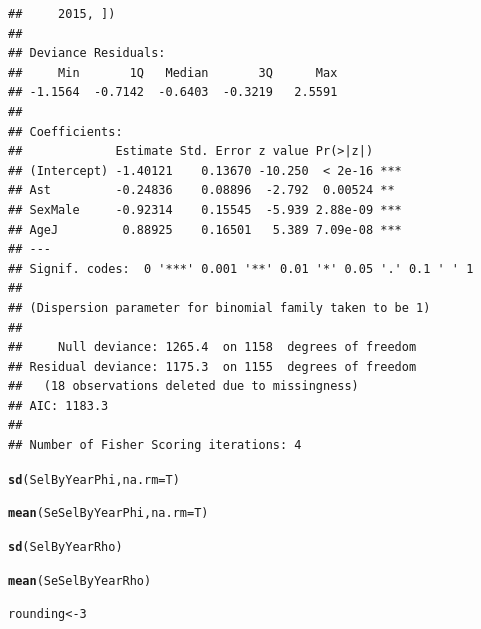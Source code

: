 \documentclass{article}\usepackage[]{graphicx}\usepackage[]{color}
\makeatletter
\newcommand{\hlnum}[1]{\textcolor[rgb]{0.686,0.059,0.569}{#1}}%
\newcommand{\hlstd}[1]{\textcolor[rgb]{0.345,0.345,0.345}{#1}}%
\newcommand{\hlkwb}[1]{\textcolor[rgb]{0.69,0.353,0.396}{#1}}%
\newcommand{\hlkwc}[1]{\textcolor[rgb]{0.333,0.667,0.333}{#1}}%
\newcommand{\hlkwd}[1]{\textcolor[rgb]{0.737,0.353,0.396}{\textbf{#1}}}%
\newenvironment{kframe}{%
 \def\at@end@of@kframe{}%
 \ifinner\ifhmode%
  \def\at@end@of@kframe{\end{minipage}}%
  \begin{minipage}{\columnwidth}%
 \fi\fi%
 \def\FrameCommand##1{\hskip\@totalleftmargin \hskip-\fboxsep
 \colorbox{shadecolor}{##1}\hskip-\fboxsep
     \hskip-\linewidth \hskip-\@totalleftmargin \hskip\columnwidth}%
 \MakeFramed {\advance\hsize-\width
   \@totalleftmargin\z@ \linewidth\hsize
   \@setminipage}}%
 {\par\unskip\endMakeFramed%
 \at@end@of@kframe}
\newenvironment{knitrout}{}{} %
\makeatother
\begin{document}
\begin{knitrout}
\begin{kframe}
\begin{verbatim}
##     2015, ])
## 
## Deviance Residuals: 
##     Min       1Q   Median       3Q      Max  
## -1.1564  -0.7142  -0.6403  -0.3219   2.5591  
## 
## Coefficients:
##             Estimate Std. Error z value Pr(>|z|)    
## (Intercept) -1.40121    0.13670 -10.250  < 2e-16 ***
## Ast         -0.24836    0.08896  -2.792  0.00524 ** 
## SexMale     -0.92314    0.15545  -5.939 2.88e-09 ***
## AgeJ         0.88925    0.16501   5.389 7.09e-08 ***
## ---
## Signif. codes:  0 '***' 0.001 '**' 0.01 '*' 0.05 '.' 0.1 ' ' 1
## 
## (Dispersion parameter for binomial family taken to be 1)
## 
##     Null deviance: 1265.4  on 1158  degrees of freedom
## Residual deviance: 1175.3  on 1155  degrees of freedom
##   (18 observations deleted due to missingness)
## AIC: 1183.3
## 
## Number of Fisher Scoring iterations: 4
\end{verbatim}
\begin{alltt}
\hlkwd{sd}\hlstd{(SelByYearPhi,}\hlkwc{na.rm}\hlstd{=T)}
\end{alltt}


{\ttfamily\noindent\bfseries\color{errorcolor}{\#\# Error in is.data.frame(x): objet 'SelByYearPhi' introuvable}}\begin{alltt}
\hlkwd{mean}\hlstd{(SeSelByYearPhi,}\hlkwc{na.rm}\hlstd{=T)}
\end{alltt}


{\ttfamily\noindent\bfseries\color{errorcolor}{\#\# Error in mean(SeSelByYearPhi, na.rm = T): objet 'SeSelByYearPhi' introuvable}}\begin{alltt}
\hlkwd{sd}\hlstd{(SelByYearRho)}
\end{alltt}


{\ttfamily\noindent\bfseries\color{errorcolor}{\#\# Error in is.data.frame(x): objet 'SelByYearRho' introuvable}}\begin{alltt}
\hlkwd{mean}\hlstd{(SeSelByYearRho)}
\end{alltt}


{\ttfamily\noindent\bfseries\color{errorcolor}{\#\# Error in mean(SeSelByYearRho): objet 'SeSelByYearRho' introuvable}}\begin{alltt}
\hlstd{rounding} \hlkwb{<-} \hlnum{3}


\end{alltt}
\end{kframe}
\end{knitrout}
\end{document}
